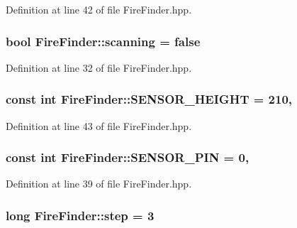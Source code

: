 Definition at line 42 of file Fire\-Finder.\-hpp.

\hypertarget{classFireFinder_aec1a3ae4b80847a907898601c64386cb}{
\subsubsection[{scanning}]{\setlength{\rightskip}{0pt plus 5cm}bool Fire\-Finder\-::scanning = false\hspace{0.3cm}{\ttfamily [private]}}}\label{classFireFinder_aec1a3ae4b80847a907898601c64386cb}


Definition at line 32 of file Fire\-Finder.\-hpp.

\hypertarget{classFireFinder_ab145c886fc3edcc215a5673bf4874b13}{
\subsubsection[{S\-E\-N\-S\-O\-R\-\_\-\-H\-E\-I\-G\-H\-T}]{\setlength{\rightskip}{0pt plus 5cm}const int Fire\-Finder\-::\-S\-E\-N\-S\-O\-R\-\_\-\-H\-E\-I\-G\-H\-T = 210\hspace{0.3cm}{\ttfamily [static]}, {\ttfamily [private]}}}\label{classFireFinder_ab145c886fc3edcc215a5673bf4874b13}


Definition at line 43 of file Fire\-Finder.\-hpp.

\hypertarget{classFireFinder_a5afc5290c8ba58893228414ba5965ed3}{
\subsubsection[{S\-E\-N\-S\-O\-R\-\_\-\-P\-I\-N}]{\setlength{\rightskip}{0pt plus 5cm}const int Fire\-Finder\-::\-S\-E\-N\-S\-O\-R\-\_\-\-P\-I\-N = 0\hspace{0.3cm}{\ttfamily [static]}, {\ttfamily [private]}}}\label{classFireFinder_a5afc5290c8ba58893228414ba5965ed3}


Definition at line 39 of file Fire\-Finder.\-hpp.

\hypertarget{classFireFinder_ad482526cf32997919cbc31f61d12065d}{
\subsubsection[{step}]{\setlength{\rightskip}{0pt plus 5cm}long Fire\-Finder\-::step = 3\hspace{0.3cm}{\ttfamily [private]}}}\label{classFireFinder_ad482526cf32997919cbc31f61d12065d}


